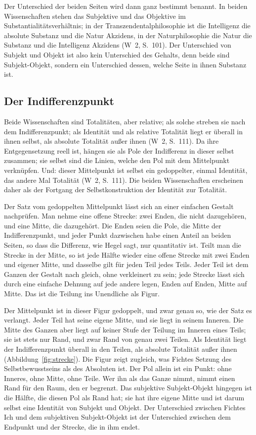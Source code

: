 \documentclass[11pt,a4paper]{article}
\newcommand{\SO}{Subjekt-Objekt}
\newcommand{\Werke}[1]{(W~2, S.~#1)}
\begin{document}
Der Unterschied der beiden Seiten wird dann ganz bestimmt benannt. In beiden Wissenschaften stehen das Subjektive und das Objektive im Substantialitätsverhältnis; in der Transzendentalphilosophie ist die Intelligenz die absolute Substanz und die Natur Akzidens, in der Naturphilosophie die Natur die Substanz und die Intelligenz Akzidens \Werke{101}. Der Unterschied von Subjekt und Objekt ist also kein Unterschied des Gehalts, denn beide sind \SO{}, sondern ein Unterschied dessen, welche Seite in ihnen Substanz ist.

\subsection{Der Indifferenzpunkt}

Beide Wissenschaften sind Totalitäten, aber relative; als solche \glqq streben sie nach dem Indifferenzpunkt; als Identität und als relative Totalität liegt er überall in ihnen selbst, als absolute Totalität außer ihnen\grqq{} \Werke{111}. Da ihre Entgegensetzung reell ist, \glqq hängen sie als Pole der Indifferenz in dieser selbst zusammen; sie selbst sind die Linien, welche den Pol mit dem Mittelpunkt verknüpfen\grqq{}. Und: \glqq dieser Mittelpunkt ist selbst ein gedoppelter, einmal Identität, das andere Mal Totalität\grqq{} \Werke{111}. Die beiden Wissenschaften erscheinen daher als der Fortgang der Selbstkonstruktion der Identität zur Totalität.

Der Satz vom gedoppelten Mittelpunkt lässt sich an einer einfachen Gestalt nachprüfen. Man nehme eine offene Strecke: zwei Enden, die nicht dazugehören, und eine Mitte, die dazugehört. Die Enden seien die Pole, die Mitte der Indifferenzpunkt, und jeder Punkt dazwischen habe einen Anteil an beiden Seiten, so dass die Differenz, wie Hegel sagt, nur quantitativ ist. Teilt man die Strecke in der Mitte, so ist jede Hälfte wieder eine offene Strecke mit zwei Enden und eigener Mitte, und dasselbe gilt für jeden Teil jedes Teils. Jeder Teil ist dem Ganzen der Gestalt nach gleich, ohne verkleinert zu sein; jede Strecke lässt sich durch eine einfache Dehnung auf jede andere legen, Enden auf Enden, Mitte auf Mitte. Das ist die Teilung ins Unendliche als Figur.

Der Mittelpunkt ist in dieser Figur gedoppelt, und zwar genau so, wie der Satz es verlangt. Jeder Teil hat seine eigene Mitte, und sie liegt in seinem Inneren. Die Mitte des Ganzen aber liegt auf keiner Stufe der Teilung im Inneren eines Teils; sie ist stets nur Rand, und zwar Rand von genau zwei Teilen. Als Identität liegt der Indifferenzpunkt überall in den Teilen, als absolute Totalität außer ihnen (Abbildung~\ref{fig:strecke}). Die Figur zeigt zugleich, was Fichtes Setzung des Selbstbewusstseins als des Absoluten ist. Der Pol allein ist ein Punkt: ohne Inneres, ohne Mitte, ohne Teile. Wer ihn als das Ganze nimmt, nimmt einen Rand für den Raum, den er begrenzt. Das subjektive \SO{} hingegen ist die Hälfte, die diesen Pol als Rand hat; sie hat ihre eigene Mitte und ist darum selbst eine Identität von Subjekt und Objekt. Der Unterschied zwischen Fichtes Ich und dem subjektiven \SO{} ist der Unterschied zwischen dem Endpunkt und der Strecke, die in ihm endet.
\end{document}
